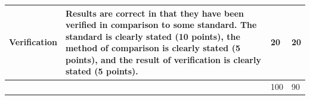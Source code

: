 \documentclass[article,12pt]{article}
\numberwithin{equation}{section}
\begin{document}
\begin{tabular}{|p{.2\linewidth}|p{.2\linewidth}|p{.2\linewidth}|p{.1\linewidth}|}
	\vspace{.2in}\textbf{Verification}        & {\tiny Results are correct in that they have been verified in comparison to some standard. The standard is clearly stated (10 points), the method of comparison is clearly stated (5 points), and the result of verification is clearly stated (5 points).}                                                                                                      & \vspace{.2in}20              &   \vspace{.2in}20    \\ \hline
	&                                                                                                                                                                                                                                                                                                                                                          & \vspace{.02in}100             &   \vspace{.02in}90     \\ \hline
\end{tabular}
\end{document}
